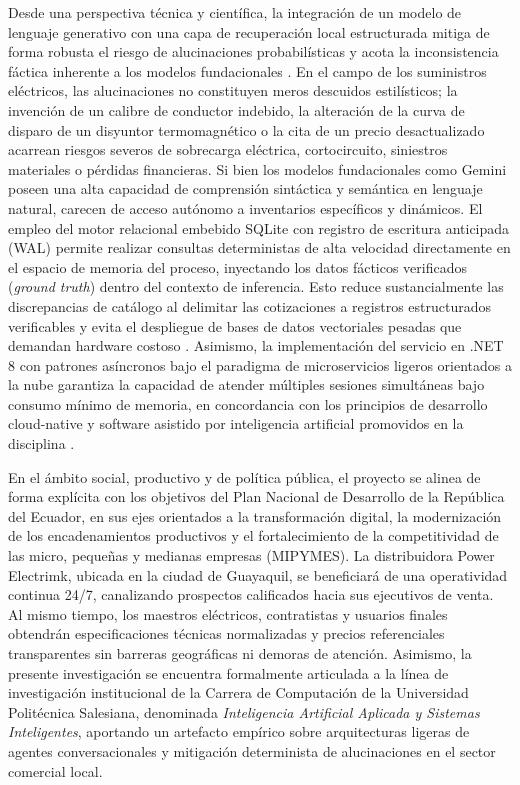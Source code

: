 Desde una perspectiva técnica y científica, la integración de un modelo de lenguaje generativo con una capa de recuperación local estructurada mitiga de forma robusta el riesgo de alucinaciones probabilísticas y acota la inconsistencia fáctica inherente a los modelos fundacionales \parencite{ji2023hallucination,huang2023survey,tonmoy2024comprehensive,lewis2020retrieval}. En el campo de los suministros eléctricos, las alucinaciones no constituyen meros descuidos estilísticos; la invención de un calibre de conductor indebido, la alteración de la curva de disparo de un disyuntor termomagnético o la cita de un precio desactualizado acarrean riesgos severos de sobrecarga eléctrica, cortocircuito, siniestros materiales o pérdidas financieras. Si bien los modelos fundacionales como Gemini poseen una alta capacidad de comprensión sintáctica y semántica en lenguaje natural, carecen de acceso autónomo a inventarios específicos y dinámicos. El empleo del motor relacional embebido SQLite con registro de escritura anticipada (WAL) permite realizar consultas deterministas de alta velocidad directamente en el espacio de memoria del proceso, inyectando los datos fácticos verificados (\textit{ground truth}) dentro del contexto de inferencia. Esto reduce sustancialmente las discrepancias de catálogo al delimitar las cotizaciones a registros estructurados verificables y evita el despliegue de bases de datos vectoriales pesadas que demandan hardware costoso \parencite{gaffney2022sqlite}. Asimismo, la implementación del servicio en .NET 8 con patrones asíncronos bajo el paradigma de microservicios ligeros orientados a la nube garantiza la capacidad de atender múltiples sesiones simultáneas bajo consumo mínimo de memoria, en concordancia con los principios de desarrollo cloud-native y software asistido por inteligencia artificial promovidos en la disciplina \parencite{kratzke2017understanding,newman2021building,taibi2020patterns,Llerena-Izquierdo2024}.

En el ámbito social, productivo y de política pública, el proyecto se alinea de forma explícita con los objetivos del Plan Nacional de Desarrollo de la República del Ecuador, en sus ejes orientados a la transformación digital, la modernización de los encadenamientos productivos y el fortalecimiento de la competitividad de las micro, pequeñas y medianas empresas (MIPYMES). La distribuidora Power Electrimk, ubicada en la ciudad de Guayaquil, se beneficiará de una operatividad continua 24/7, canalizando prospectos calificados hacia sus ejecutivos de venta. Al mismo tiempo, los maestros eléctricos, contratistas y usuarios finales obtendrán especificaciones técnicas normalizadas y precios referenciales transparentes sin barreras geográficas ni demoras de atención. Asimismo, la presente investigación se encuentra formalmente articulada a la línea de investigación institucional de la Carrera de Computación de la Universidad Politécnica Salesiana, denominada \textit{Inteligencia Artificial Aplicada y Sistemas Inteligentes}, aportando un artefacto empírico sobre arquitecturas ligeras de agentes conversacionales y mitigación determinista de alucinaciones en el sector comercial local.


